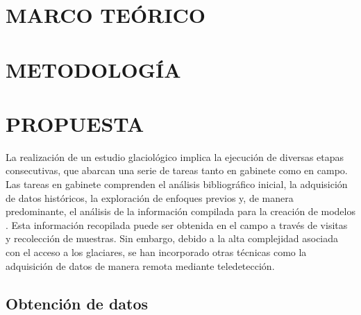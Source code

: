 \documentclass[12pt]{report}
\begin{document}


\chapter{MARCO TEÓRICO}
\label{chp:MarcoTeorico}
\thispagestyle{fancy} %





\chapter{METODOLOGÍA}
\label{chp:Metodologia}
\thispagestyle{fancy} %















\chapter{PROPUESTA}
\label{chp:Propuesta}
\thispagestyle{fancy} %

 
La realización de un estudio glaciológico implica la ejecución de diversas etapas consecutivas, que abarcan una serie de tareas tanto en gabinete como en campo. Las tareas en gabinete comprenden el análisis bibliográfico inicial, la adquisición de datos históricos, la exploración de enfoques previos y, de manera predominante, el análisis de la información compilada para la creación de modelos \cite{ermolin2015ambientes}. Esta información recopilada puede ser obtenida en el campo a través de visitas y recolección de muestras. Sin embargo, debido a la alta complejidad asociada con el acceso a los glaciares, se han incorporado otras técnicas como la adquisición de datos de manera remota mediante teledetección.

\section{Obtención de datos}
\end{document}
